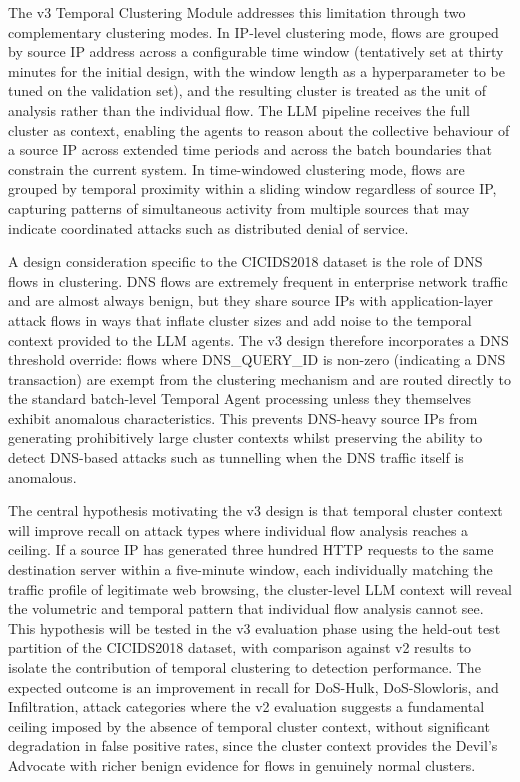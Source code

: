 The v3 Temporal Clustering Module addresses this limitation through two complementary clustering modes. In IP-level clustering mode, flows are grouped by source IP address across a configurable time window (tentatively set at thirty minutes for the initial design, with the window length as a hyperparameter to be tuned on the validation set), and the resulting cluster is treated as the unit of analysis rather than the individual flow. The LLM pipeline receives the full cluster as context, enabling the agents to reason about the collective behaviour of a source IP across extended time periods and across the batch boundaries that constrain the current system. In time-windowed clustering mode, flows are grouped by temporal proximity within a sliding window regardless of source IP, capturing patterns of simultaneous activity from multiple sources that may indicate coordinated attacks such as distributed denial of service.

A design consideration specific to the CICIDS2018 dataset is the role of DNS flows in clustering. DNS flows are extremely frequent in enterprise network traffic and are almost always benign, but they share source IPs with application-layer attack flows in ways that inflate cluster sizes and add noise to the temporal context provided to the LLM agents. The v3 design therefore incorporates a DNS threshold override: flows where DNS\_QUERY\_ID is non-zero (indicating a DNS transaction) are exempt from the clustering mechanism and are routed directly to the standard batch-level Temporal Agent processing unless they themselves exhibit anomalous characteristics. This prevents DNS-heavy source IPs from generating prohibitively large cluster contexts whilst preserving the ability to detect DNS-based attacks such as tunnelling when the DNS traffic itself is anomalous.

The central hypothesis motivating the v3 design is that temporal cluster context will improve recall on attack types where individual flow analysis reaches a ceiling. If a source IP has generated three hundred HTTP requests to the same destination server within a five-minute window, each individually matching the traffic profile of legitimate web browsing, the cluster-level LLM context will reveal the volumetric and temporal pattern that individual flow analysis cannot see. This hypothesis will be tested in the v3 evaluation phase using the held-out test partition of the CICIDS2018 dataset, with comparison against v2 results to isolate the contribution of temporal clustering to detection performance. The expected outcome is an improvement in recall for DoS-Hulk, DoS-Slowloris, and Infiltration, attack categories where the v2 evaluation suggests a fundamental ceiling imposed by the absence of temporal cluster context, without significant degradation in false positive rates, since the cluster context provides the Devil's Advocate with richer benign evidence for flows in genuinely normal clusters.
